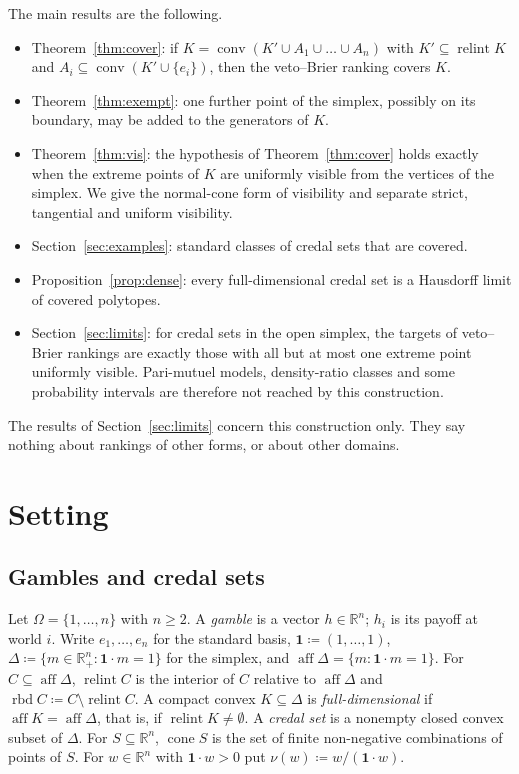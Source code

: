 \documentclass[11pt]{article}
\newcommand{\R}{\mathbb{R}}
\newcommand{\one}{\mathbf{1}}
\DeclareMathOperator{\conv}{conv}
\DeclareMathOperator{\cone}{cone}
\DeclareMathOperator{\relint}{relint}
\DeclareMathOperator{\rbd}{rbd}
\DeclareMathOperator{\aff}{aff}
\theoremstyle{plain}
\theoremstyle{definition}
\theoremstyle{remark}
\begin{document}
The main results are the following.
\begin{itemize}
  \item Theorem~\ref{thm:cover}: if $K=\conv(K'\cup A_1\cup\dots\cup A_n)$ with
  $K'\subseteq\relint K$ and $A_i\subseteq\conv(K'\cup\{e_i\})$, then the veto--Brier
  ranking covers $K$.
  \item Theorem~\ref{thm:exempt}: one further point of the simplex, possibly on its
  boundary, may be added to the generators of $K$.
  \item Theorem~\ref{thm:vis}: the hypothesis of Theorem~\ref{thm:cover} holds exactly
  when the extreme points of $K$ are uniformly visible from the vertices of the simplex.
  We give the normal-cone form of visibility and separate strict, tangential and uniform
  visibility.
  \item Section~\ref{sec:examples}: standard classes of credal sets that are covered.
  \item Proposition~\ref{prop:dense}: every full-dimensional credal set is a Hausdorff
  limit of covered polytopes.
  \item Section~\ref{sec:limits}: for credal sets in the open simplex, the targets of
  veto--Brier rankings are exactly those with all but at most one extreme point uniformly
  visible. Pari-mutuel models, density-ratio classes and some probability intervals are
  therefore not reached by this construction.
\end{itemize}
The results of Section~\ref{sec:limits} concern this construction only. They say nothing
about rankings of other forms, or about other domains.

\section{Setting}\label{sec:setting}

\subsection{Gambles and credal sets}

Let $\Omega=\{1,\dots,n\}$ with $n\ge2$. A \emph{gamble} is a vector $h\in\R^n$; $h_i$ is
its payoff at world $i$. Write $e_1,\dots,e_n$ for the standard basis, $\one\coloneqq
(1,\dots,1)$, $\Delta\coloneqq\{m\in\R^n_+:\one\cdot m=1\}$ for the simplex, and
$\aff\Delta=\{m:\one\cdot m=1\}$. For $C\subseteq\aff\Delta$, $\relint C$ is the interior
of $C$ relative to $\aff\Delta$ and $\rbd C\coloneqq C\setminus\relint C$. A compact
convex $K\subseteq\Delta$ is \emph{full-dimensional} if $\aff K=\aff\Delta$, that is, if
$\relint K\neq\emptyset$. A \emph{credal set} is a nonempty closed convex subset of
$\Delta$. For $S\subseteq\R^n$, $\cone S$ is the set of finite non-negative combinations
of points of $S$. For $w\in\R^n$ with $\one\cdot w>0$ put $\nu(w)\coloneqq w/(\one\cdot
w)$.
\end{document}
